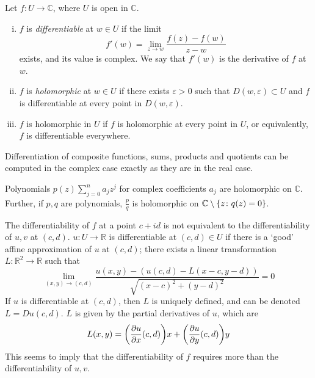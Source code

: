 \begin{definition}
	Let \( f \colon U \to \mathbb C \), where \( U \) is open in \( \mathbb C \).
	\begin{enumerate}[(i)]
		\item \( f \) is \textit{differentiable} at \( w \in U \) if the limit
			\[ f'(w) = \lim_{z \to w} \frac{f(z) - f(w)}{z-w} \]
			exists, and its value is complex.
			We say that \( f'(w) \) is the derivative of \( f \) at \( w \).
		\item \( f \) is \textit{holomorphic} at \( w \in U \) if there exists \( \varepsilon > 0 \) such that \( D(w, \varepsilon) \subset U \) and \( f \) is differentiable at every point in \( D(w, \varepsilon) \).
		\item \( f \) is holomorphic in \( U \) if \( f \) is holomorphic at every point in \( U \), or equivalently, \( f \) is differentiable everywhere.
	\end{enumerate}
\end{definition}

Differentiation of composite functions, sums, products and quotients can be computed in the complex case exactly as they are in the real case.

\begin{example}
	Polynomials \( p(z) \sum_{j=0}^n a_j z^j \) for complex coefficients \( a_j \) are holomorphic on \( \mathbb C \).
	Further, if \( p, q \) are polynomials, \( \frac{p}{q} \) is holomorphic on \( \mathbb C \setminus \qty{z \colon q(z) = 0} \).
\end{example}

\begin{remark}
	The differentiability of \( f \) at a point \( c + id \) is not equivalent to the differentiability of \( u, v \) at \( (c,d) \).
	\( u \colon U \to \mathbb R \) is differentiable at \( (c,d) \in U \) if there is a `good' affine approximation of \( u \) at \( (c,d) \); there exists a linear transformation \( L \colon \mathbb R^2 \to \mathbb R \) such that
	\[ \lim_{(x,y) \to (c,d)} \frac{u(x,y) - (u(c,d)-L(x-c,y-d))}{\sqrt{(x-c)^2+(y-d)^2}} = 0 \]
	If \( u \) is differentiable at \( (c,d) \), then \( L \) is uniquely defined, and can be denoted \( L = D u(c,d) \).
	\( L \) is given by the partial derivatives of \( u \), which are
	\[ L(x,y) = \qty(\pdv{u}{x}\qty(c,d))x+\qty(\pdv{u}{y}\qty(c,d))y \]
	This seems to imply that the differentiability of \( f \) requires more than the differentiability of \( u,v \).
\end{remark}

